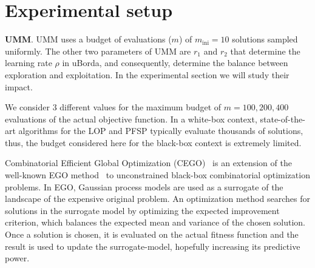 \documentclass[sigconf,dvipsnames]{acmart}
\DeclareMathOperator*{\argmax}{arg\,max}
\newcommand{\minit}{\ensuremath{m_\text{ini}}\xspace}
\newcommand{\FEmax}{\ensuremath{m}}
\begin{document}






\newcommand{\myparagraph}[1]{\smallskip{}\noindent\textbf{#1}.}


\section{Experimental setup}\label{sec:setup}

\myparagraph{UMM}
%
UMM uses a budget of evaluations ($\FEmax$) of  $\minit=10$ solutions sampled uniformly.
The other two parameters of UMM are $r_1$ and $r_2$ that determine the learning rate $\rho$ in uBorda, and consequently, determine the
balance between exploration and exploitation. In the experimental section we
will study their impact.

We consider 3 different values for the maximum budget of $\FEmax=100, 200,400$ evaluations of the
actual objective function. In a white-box context, state-of-the-art algorithms
for the LOP and PFSP typically evaluate thousands of solutions,
thus, the budget considered here for the black-box context is extremely
limited.

Combinatorial Efficient Global Optimization (CEGO)~\citep{ZaeStoFriFisNauBar2014} is an extension of the well-known EGO
method~\citep{JonSchWel98go} to unconstrained black-box combinatorial
optimization problems. In EGO, Gaussian process models are used as a surrogate
of the landscape of the expensive original problem. An optimization method
searches for solutions in the surrogate model by optimizing the expected
improvement criterion, which balances the expected mean and variance of the
chosen solution. Once a solution is chosen, it is evaluated on the actual
fitness function and the result is used to update the surrogate-model,
hopefully increasing its predictive power.
\end{document}
